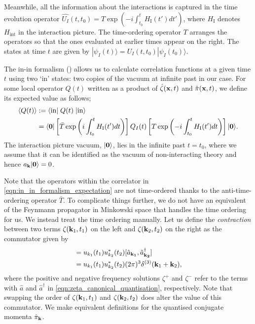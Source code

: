 Meanwhile, all the information about the interactions is captured in the time evolution operator $\hat{U_I}(t,t_0) = T\exp \left(-i\int_{t_0}^t H_\text{I}(t')dt'\right)$, where $H_\text{I}$ denotes $H_\text{int}$ in the interaction picture. The time-ordering operator $T$ arranges the operators so that the ones evaluated at earlier times appear on the right. The states at time $t$ are given by $|\psi_I(t)\rangle = U_I(t,t_0) |\psi_I(t_0)\rangle$.

The in-in formalism (\cite{Schwinger1961inin,Jordan1986inincosmo1,Calzetta1987inincosmo2}) allows us to calculate correlation functions at a given time $t$ using two `in' states: two copies of the vacuum at infinite past in our case. For some local operator $Q(t)$ written as a product of $\hat{\zeta}(\mathbf{x},t)$ and $\hat{\pi}(\mathbf{x},t)$, we define its expected value as follows;
\begin{align}
	\left< Q(t) \right> &:= \langle \textrm{in} |\;Q(t)\;| \textrm{in} \rangle \nonumber\\ &=  \langle\mathbf{0}| \left[ \bar{T} \exp \left( i \int_{t_0}^{t} H_\text{I}(t')dt \right) \right] Q_I(t) \left[ T \exp \left( -i \int_{t_0}^{t} H_\text{I}(t')dt \right) \right]  |\mathbf{0}\rangle. \label{eqn:in_in_formalism_expectation}
\end{align}
The interaction picture vacuum, $|\mathbf{0}\rangle$, lies in the infinite past $t=t_0$, where we assume that it can be identified as the vacuum of non-interacting theory and hence $a_\mathbf{k}|\mathbf{0}\rangle = 0$.

Note that the operators within the correlator in \eqref{eqn:in_in_formalism_expectation} are not time-ordered thanks to the anti-time-ordering operator $\bar{T}$. To complicate things further, we do not have an equivalent of the Feynmann propagator in Minkowski space that handles the time ordering for us. We instead treat the time ordering manually. Let us define the \textit{contraction} between two terms $\zeta(\mathbf{k}_1,t_1)$ on the left and $\zeta(\mathbf{k}_2,t_2)$ on the right as the commutator given by
\begin{align}
	[ \zeta^+(\vv{k}_1,t_1) , \zeta^-(\vv{k}_2,t_2) ] &= u_{k_1}(t_1) u^*_{k_2}(t_2) [ \hat{a}_{\vv{k_1}}, \hat{a}_{\vv{k_2}}^\dagger] \\ &= u_{k_1}(t_1) u^*_{k_2}(t_2) (2\pi)^3 \delta^{(3)} (\vv{k}_1 + \vv{k}_2), 
\end{align}
where the positive and negative frequency solutions $\zeta^+$ and $\zeta^-$ refer to the terms with $\hat{a}$ and $\hat{a}^\dagger$ in \eqref{eqn:zeta_canonical_quantisation}, respectively. Note that swapping the order of $\zeta(\mathbf{k}_1,t_1)$ and $\zeta(\mathbf{k}_2,t_2)$ does alter the value of this commutator. We make equivalent definitions for the quantised conjugate momenta $\hat{\pi}_\mathbf{k}$.

